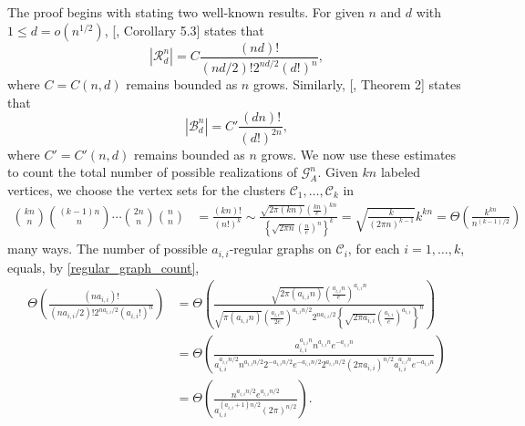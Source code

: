 \documentclass[11pt,reqno]{amsart}
\theoremstyle{definition}
\theoremstyle{remark}
\theoremstyle{conjecture}
\begin{document}
The proof begins with stating two well-known results. For given $n$ and $d$ with $1 \leqslant d = o\left(n^{1/2}\right)$, [\cite{01}, Corollary 5.3] states that
\begin{equation}\label{regular_graph_count}
\left|\mathcal{R}^{n}_{d}\right| = C \frac{(nd)!}{(nd/2)! 2^{nd/2}(d!)^{n}},
\end{equation}
where $C = C(n, d)$ remains bounded as $n$ grows. Similarly, [\cite{02}, Theorem 2] states that 
\begin{equation}\label{bipartite_regular_graph_count}
\left|\mathcal{B}^{n}_{d}\right| = C' \frac{(dn)!}{(d!)^{2n}},
\end{equation}
where $C' = C'(n,d)$ remains bounded as $n$ grows. We now use these estimates to count the total number of possible realizations of $\mathcal{G}^{n}_{A}$. %
Given $kn$ labeled vertices, we choose the vertex sets for the clusters $\mathcal{C}_{1}, \ldots, \mathcal{C}_{k}$ in 
\begin{align}
{kn \choose n} {(k-1)n \choose n} \cdots {2n \choose n} {n \choose n} &= \frac{(kn)!}{\left(n!\right)^{k}} \sim \frac{\sqrt{2 \pi (k n)} \left(\frac{k n}{e}\right)^{k n}}{\left\{\sqrt{2 \pi n} \left(\frac{n}{e}\right)^{n}\right\}^{k}} = \sqrt{\frac{k}{\left(2 \pi n\right)^{k-1}}} k^{kn} = \Theta\left(\frac{k^{kn}}{n^{(k-1)/2}}\right) \nonumber
\end{align}
many ways. The number of possible $a_{i,i}$-regular graphs on $\mathcal{C}_{i}$, for each $i = 1, \ldots, k$, equals, by \eqref{regular_graph_count},
\begin{align}%
\Theta\left(\frac{(n a_{i,i})!}{(n a_{i,i}/2)! 2^{n a_{i,i}/2}(a_{i,i}!)^{n}}\right) &= \Theta\left(\frac{\sqrt{2 \pi (a_{i,i} n)} \left(\frac{a_{i,i} n}{e}\right)^{a_{i,i} n}}{\sqrt{\pi (a_{i,i} n)} \left(\frac{a_{i,i} n}{2 e}\right)^{a_{i,i} n/2} 2^{n a_{i,i}/2} \left\{\sqrt{2 \pi a_{i,i}} \left(\frac{a_{i,i}}{e}\right)^{a_{i,i}}\right\}^{n}}\right) \nonumber\\
&= \Theta\left(\frac{a_{i,i}^{a_{i,i} n} n^{a_{i,i} n} e^{-a_{i,i} n}}{a_{i,i}^{a_{i,i} n/2} n^{a_{i,i} n/2} 2^{-a_{i,i}n/2} e^{-a_{i,i}n/2} 2^{a_{i,i} n/2} \left(2 \pi a_{i,i}\right)^{n/2} a_{i,i}^{a_{i,i} n} e^{-a_{i,i} n}}\right) \nonumber\\
&= \Theta\left(\frac{n^{a_{i,i} n/2} e^{a_{i,i}n/2} }{a_{i,i}^{(a_{i,i}+1)n/2} (2\pi)^{n/2}}\right). \nonumber
\end{align}
\end{document}
